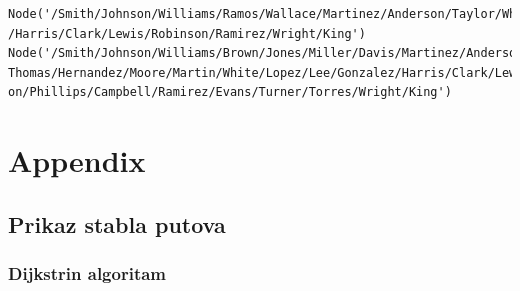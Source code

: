\documentclass[11pt]{article}
\begin{document}
    \begin{Verbatim}[commandchars=\\\{\}]
Node('/Smith/Johnson/Williams/Ramos/Wallace/Martinez/Anderson/Taylor/White/Lopez
/Harris/Clark/Lewis/Robinson/Ramirez/Wright/King')
Node('/Smith/Johnson/Williams/Brown/Jones/Miller/Davis/Martinez/Anderson/Taylor/
Thomas/Hernandez/Moore/Martin/White/Lopez/Lee/Gonzalez/Harris/Clark/Lewis/Robins
on/Phillips/Campbell/Ramirez/Evans/Turner/Torres/Wright/King')
    \end{Verbatim}

    \hypertarget{appendix}{%
\section{Appendix}\label{appendix}}

    \hypertarget{prikaz-stabla-putova}{%
\subsection{Prikaz stabla putova}\label{prikaz-stabla-putova}}

    \hypertarget{dijkstrin-algoritam}{%
\subsubsection{Dijkstrin algoritam}\label{dijkstrin-algoritam}}
\end{document}
